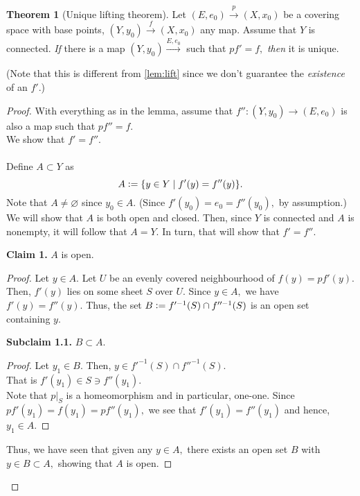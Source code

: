 \documentclass[12pt]{article}
\theoremstyle{definition}
\newtheorem{thm}{Theorem}
\numberwithin{thm}{section}
\let\emptyset\varnothing
\newenvironment{blockquote}
{\begin{mdframed}[skipabove=0pt, skipbelow=0pt, innertopmargin=4pt, innerbottommargin=4pt, bottomline=false,topline=false,rightline=false, linewidth=2pt]}
{\end{mdframed}}
\begin{document}
\begin{thm}[Unique lifting theorem] \label{thm:uniquelift}
	Let $(E, e_0) \overset{p}{\longrightarrow} (X, x_0)$ be a covering space with base points, $(Y, y_0) \overset{f}{\longrightarrow} (X, x_0)$ any map. Assume that $Y$ is connected. \emph{If} there is a map $(Y, y_0) \overset{E, e_0}{\longrightarrow}$ such that $pf' = f,$ \emph{then} it is unique.
\end{thm}
(Note that this is different from \cref{lem:lift} since we don't guarantee the \emph{existence} of an $f'.$)
\begin{proof} 
	With everything as in the lemma, assume that $f'':(Y, y_0) \to (E, e_0)$ is also a map such that $pf'' = f.$\\
	We show that $f' = f''.$\\~\\
	Define $A \subset Y$ as
	\begin{equation*} 
		A \vcentcolon= \{y \in Y \mid f'(y) = f''(y)\}.
	\end{equation*}
	Note that $A \neq \emptyset$ since $y_0 \in A.$ (Since $f'(y_0) = e_0 = f''(y_0),$ by assumption.)\\
	We will show that $A$ is both open and closed. Then, since $Y$ is connected and $A$ is nonempty, it will follow that $A = Y.$ In turn, that will show that $f' = f''.$\\
	\begin{blockquote}
		\textbf{Claim 1.} $A$ is open.
		\begin{proof} 
			Let $y \in A.$ Let $U$ be an evenly covered neighbourhood of $f(y) = pf'(y).$\\
			Then, $f'(y)$ lies on some sheet $S$ over $U.$ Since $y \in A,$ we have $f'(y) = f''(y).$ Thus, the set $B \vcentcolon= f'^{-1}(S) \cap f''^{-1}(S)$ is an open set containing $y.$\\
			\begin{blockquote}
				\textbf{Subclaim 1.1.} $B \subset A.$
				\begin{proof} 
					Let $y_1 \in B.$ Then, $y \in f'^{-1}(S) \cap f''^{-1}(S).$ \\
					That is $f'(y_1) \in S \ni f''(y_1).$\\
					Note that $p|_S$ is a homeomorphism and in particular, one-one. Since $pf'(y_1) = f(y_1) = pf''(y_1),$ we see that $f'(y_1) = f''(y_1)$ and hence, $y_1 \in A.$
				\end{proof}
			\end{blockquote}
			Thus, we have seen that given any $y \in A,$ there exists an open set $B$ with $y \in B \subset A,$ showing that $A$ is open.

\end{proof}
\end{blockquote}
\end{proof}
\end{document}
